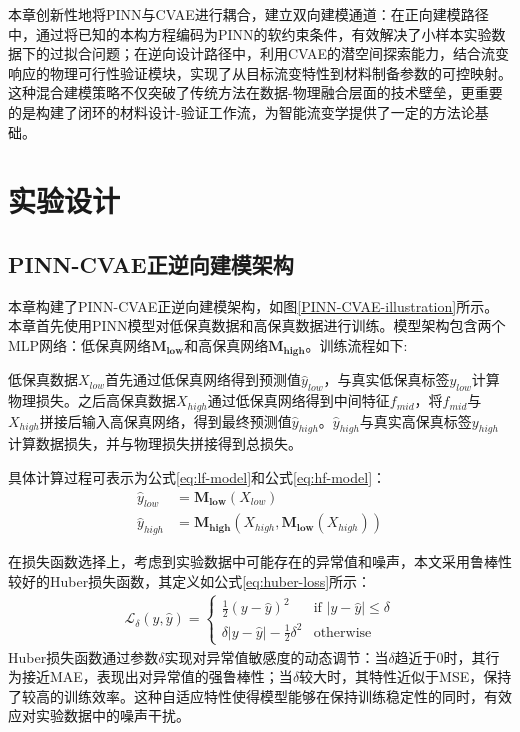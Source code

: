 本章创新性地将PINN与CVAE进行耦合，建立双向建模通道：在正向建模路径中，通过将已知的本构方程编码为PINN的软约束条件，有效解决了小样本实验数据下的过拟合问题；在逆向设计路径中，利用CVAE的潜空间探索能力，结合流变响应的物理可行性验证模块，实现了从目标流变特性到材料制备参数的可控映射。这种混合建模策略不仅突破了传统方法在数据-物理融合层面的技术壁垒，更重要的是构建了闭环的材料设计-验证工作流，为智能流变学提供了一定的方法论基础。
\section{实验设计}
\subsection{PINN-CVAE正逆向建模架构} \label{PINN-CVAE架构}
本章构建了PINN-CVAE正逆向建模架构，如图\ref{PINN-CVAE-illustration}所示。
本章首先使用PINN模型对低保真数据和高保真数据进行训练。模型架构包含两个MLP网络：低保真网络$\mathbf{M_{low}}$和高保真网络$\mathbf{M_{high}}$。训练流程如下:

低保真数据$X_{low}$首先通过低保真网络得到预测值$\hat{y}_{low}$，与真实低保真标签$y_{low}$计算物理损失。之后高保真数据$X_{high}$通过低保真网络得到中间特征$f_{mid}$，将$f_{mid}$与$X_{high}$拼接后输入高保真网络，得到最终预测值$\hat{y}_{high}$。$\hat{y}_{high}$与真实高保真标签$y_{high}$计算数据损失，并与物理损失拼接得到总损失。

具体计算过程可表示为公式\eqref{eq:lf-model}和公式\eqref{eq:hf-model}：
\begin{align}
  \hat{y}_{low}  & = \mathbf{M_{low}}(X_{low}) \label{eq:lf-model}                               \\
  \hat{y}_{high} & = \mathbf{M_{high}}(X_{high}, \mathbf{M_{low}}(X_{high})) \label{eq:hf-model}
\end{align}

在损失函数选择上，考虑到实验数据中可能存在的异常值和噪声，本文采用鲁棒性较好的Huber损失函数，其定义如公式\eqref{eq:huber-loss}所示：
\begin{equation}
  \begin{aligned}
    \mathcal{L}_\delta(y, \hat{y}) =
    \begin{cases}
      \frac{1}{2}(y - \hat{y})^2                 & \text{if } |y - \hat{y}| \le \delta    \\
      \delta |y - \hat{y}| - \frac{1}{2}\delta^2 & \text{otherwise} \label{eq:huber-loss}
    \end{cases}
  \end{aligned}
\end{equation}
Huber损失函数通过参数$\delta$实现对异常值敏感度的动态调节：当$\delta$趋近于0时，其行为接近MAE，表现出对异常值的强鲁棒性；当$\delta$较大时，其特性近似于MSE，保持了较高的训练效率。这种自适应特性使得模型能够在保持训练稳定性的同时，有效应对实验数据中的噪声干扰。

